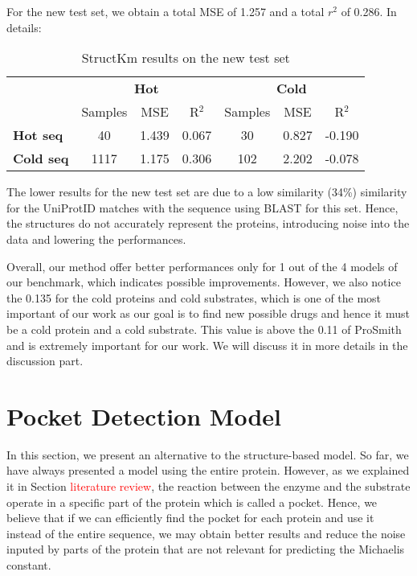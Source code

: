 For the new test set, we obtain a total MSE of 1.257 and a total $r^2$ of 0.286. In details:

\begin{table}[ht]
  \centering
  \begin{tabular}{lcccccc}
  \hline
   & \multicolumn{3}{c}{\textbf{Hot}} & \multicolumn{3}{c}{\textbf{Cold}} \\
   & Samples & MSE & R\(^2\) & Samples & MSE & R\(^2\) \\ \hline
  \textbf{Hot seq}  & 40 & 1.439 & 0.067 & 30 & 0.827 & -0.190 \\
  \textbf{Cold seq} & 1117 & 1.175 & 0.306 & 102 & 2.202 & -0.078 \\ \hline
  \end{tabular}
  \caption{StructKm results on the new test set}
  \label{tab:summary_performance}
\end{table}

The lower results for the new test set are due to a low similarity (34\%) similarity for the UniProtID 
matches with the sequence using BLAST for this set. Hence, the structures do not accurately represent the
proteins, introducing noise into the data and lowering the performances.

Overall, our method offer better performances only for 1 out of the 4 models of our benchmark, which indicates 
possible improvements. However, we also notice the 0.135 for the cold proteins and cold substrates, which is
one of the most important of our work as our goal is to find new possible drugs and hence it must be a cold protein
and a cold substrate. This value is above the 0.11 of ProSmith and is extremely important for our work. We will
discuss it in more details in the discussion part.

\section{Pocket Detection Model}

In this section, we present an alternative to the structure-based model. So far, we have always presented
a model using the entire protein. However, as we explained it in Section \textcolor{red}{literature review},
the reaction between the enzyme and the substrate operate in a specific part of the protein which is called
a pocket. Hence, we believe that if we can efficiently find the pocket for each protein and use it instead of
the entire sequence, we may obtain better results and reduce the noise inputed by parts of the protein that 
are not relevant for predicting the Michaelis constant. 

